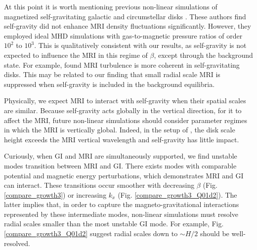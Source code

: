 
At this point it is worth mentioning previous non-linear simulations 
of magnetized self-gravitating galactic and circumstellar disks
\citep{kim03,fromang04a,fromang04}. These authors find self-gravity
did not enhance MRI density fluctuations significantly. However, they
employed ideal MHD simulations with gas-to-magnetic pressure ratios of
order $10^2$ to $10^3$. %
This is qualitatively consistent with our results, as 
self-gravity is not expected to influence the MRI in this  
regime of $\beta$, except through the background state. 
For example, \cite{fromang04} found
MRI turbulence is more coherent in self-gravitating disks. This may be related
to our finding that small radial scale MRI is suppressed when
self-gravity is included in the background equilibria. 

Physically, we expect MRI to interact with self-gravity when
their spatial scales are similar. Because self-gravity acts globally in the
vertical direction, for it to affect the MRI, future non-linear
simulations should consider parameter regimes in which the MRI is
vertically global. %
Indeed, in the setup of \cite{kim03}, the disk
scale height exceeds the MRI vertical wavelength and self-gravity has
little impact.   



Curiously, when GI and MRI are simultaneously supported, we find
unstable modes transition between MRI and GI. There exists modes 
with comparable potential and magnetic energy perturbations, which 
demonstrates MRI and GI can interact. These 
transitions occur smoother with decreasing $\beta$
(Fig. \ref{compare_growth3}) or increasing $k_x$
(Fig. \ref{compare_growth3_Q01d2}). The latter implies that, in order
to capture the magneto-gravitational interactions represented by these
intermediate modes, non-linear simulations must resolve radial scales
smaller than the most unstable GI mode. For example, 
Fig. \ref{compare_growth3_Q01d2} suggest radial scales down to $\sim H/2$
should be well-resolved. 


